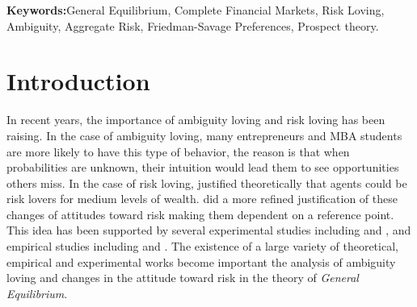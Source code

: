 \documentclass[pdftex]{article}
\numberwithin{equation}{section}
\theoremstyle{th}
\newtheorem{proof lemma}{{Proof Lemma}.}
\theoremstyle{definition}
\begin{document}


\textbf{Keywords:}{General Equilibrium}, 
{Complete Financial Markets},
{Risk Loving},
{Ambiguity},
{Aggregate Risk},
{Friedman-Savage Preferences}, {Prospect theory}.

\newpage
\doublespacing

\section*{Introduction}

In recent years, the importance of ambiguity loving and risk loving has been raising. In the case of ambiguity loving, many entrepreneurs and MBA students are more likely to have this type of behavior, the reason is that when probabilities are unknown, their intuition would lead them to see opportunities others miss. In the case of risk loving, \cite{FS} justified theoretically that agents could be risk lovers for medium levels of wealth. \cite{KT92} did a more refined justification of these changes of attitudes toward risk making them dependent on a reference point. This idea has been supported by several experimental studies including \cite{KT} and \cite{ABW}, and empirical studies including \cite{CSSG} and \cite{SP}. The existence of a large variety of theoretical, empirical and experimental works become important the analysis of ambiguity loving and changes in the attitude toward risk in the theory of \emph{General Equilibrium}.



\end{document}
